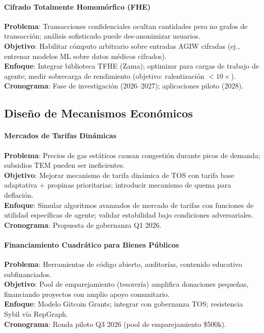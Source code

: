 \documentclass[11pt]{article}
\begin{document}
\paragraph{Cifrado Totalmente Homomórfico (FHE)}
\textbf{Problema}: Transacciones confidenciales ocultan cantidades pero no grafos de transacción; análisis sofisticado puede des-anonimizar usuarios.\\
\textbf{Objetivo}: Habilitar cómputo arbitrario sobre entradas AGIW cifradas (ej., entrenar modelos ML sobre datos médicos cifrados).\\
\textbf{Enfoque}: Integrar biblioteca TFHE (Zama); optimizar para cargas de trabajo de agente; medir sobrecarga de rendimiento (objetivo: ralentización $<10\times$).\\
\textbf{Cronograma}: Fase de investigación (2026--2027); aplicaciones piloto (2028).

\subsection{Diseño de Mecanismos Económicos}

\paragraph{Mercados de Tarifas Dinámicas}
\textbf{Problema}: Precios de gas estáticos causan congestión durante picos de demanda; subsidios TEM pueden ser ineficientes.\\
\textbf{Objetivo}: Mejorar mecanismo de tarifa dinámica de TOS con tarifa base adaptativa + propinas prioritarias; introducir mecanismo de quema para deflación.\\
\textbf{Enfoque}: Simular algoritmos avanzados de mercado de tarifas con funciones de utilidad específicas de agente; validar estabilidad bajo condiciones adversariales.\\
\textbf{Cronograma}: Propuesta de gobernanza Q1 2026.

\paragraph{Financiamiento Cuadrático para Bienes Públicos}
\textbf{Problema}: Herramientas de código abierto, auditorías, contenido educativo subfinanciados.\\
\textbf{Objetivo}: Pool de emparejamiento (tesorería) amplifica donaciones pequeñas, financiando proyectos con amplio apoyo comunitario.\\
\textbf{Enfoque}: Modelo Gitcoin Grants; integrar con gobernanza TOS; resistencia Sybil vía RepGraph.\\
\textbf{Cronograma}: Ronda piloto Q3 2026 (pool de emparejamiento \$500k).
\end{document}
